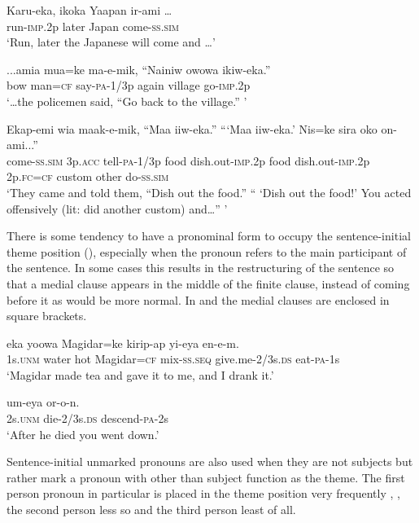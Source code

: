 \ea%
\label{ex:3:x1777}
\gll Karu-eka, ikoka Yaapan ir-ami {\dots} \\
run-\textsc{imp}.2p later Japan come-\textsc{ss}.\textsc{sim}\\
\glt`Run, later the Japanese will come and {\dots}'
\z

\ea%
\label{ex:3:x1778}
\gll ...amia mua=ke ma-e-mik, ``Nainiw owowa ikiw-eka.'' \\
bow man=\textsc{cf} say-\textsc{pa}-1/3p again village go-\textsc{imp}.2p\\
\glt`{\dots}the policemen said, ``Go back to the village.'' '
\z

\ea%
\label{ex:3:x1779}
\gll Ekap-emi wia maak-e-mik, ``Maa iiw-eka.'' ```Maa iiw-eka.' Nis=ke sira oko on-ami...''\\
come-\textsc{ss}.\textsc{sim} 3p.\textsc{acc} tell-\textsc{pa}-1/3p food dish.out-\textsc{imp}.2p food dish.out-\textsc{imp}.2p 2p.\textsc{fc}=\textsc{cf} custom other do-\textsc{ss}.\textsc{sim}\\
\glt`They came and told them, ``Dish out the food.'' `` `Dish out the food!' You acted offensively (lit: did another custom) and{\dots}'' '
\z

There is some tendency to have a pronominal form to occupy the sentence-initial theme position (), especially when the pronoun refers to the main participant of the sentence. In some cases this results in the restructuring of the sentence so that a medial clause appears in the middle of the finite clause, instead of coming before it as would be more normal. In  and  the medial clauses are enclosed in square brackets. 

\ea%
\label{ex:3:x539}
\gll {} {\ob}eka yoowa Magidar=ke kirip-ap yi-eya{\cb} en-e-m.\\
1s.\textsc{unm} water hot Magidar=\textsc{cf} mix-\textsc{ss}.\textsc{seq} give.me-2/3s.\textsc{ds} eat-\textsc{pa}-1s\\
\glt`Magidar made tea and gave it to me, and I drank it.'
\z

\ea%
\label{ex:3:x540}
\gll {} {\ob}um-eya{\cb} or-o-n. \\
2s.\textsc{unm} die-2/3s.\textsc{ds} descend-\textsc{pa}-2s\\
\glt`After he died you went down.'
\z

Sentence-initial unmarked pronouns are also used when they are not subjects but rather mark a pronoun with other than subject function as the theme. The first person pronoun in particular is placed in the theme position very frequently , , the second person less so and the third person least of all.

